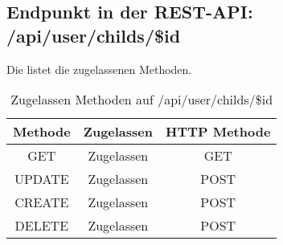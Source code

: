 \subsection{Endpunkt in der REST-API: /api/user/childs/\$id}
Die  listet die zugelassenen Methoden. 

\begin{table}[!htbp]
	\begin{tabular}{|c|c|c|}
		\hline
			\textbf{Methode} & \textbf{Zugelassen} & \textbf{HTTP Methode} \\ \hline
			GET & Zugelassen & GET \\ \hline
			UPDATE & Zugelassen & POST \\ \hline 
			CREATE & Zugelassen & POST \\ \hline 
			DELETE & Zugelassen & POST \\ \hline
	\end{tabular}

		\caption{Zugelassen Methoden auf /api/user/childs/\$id}
		\label{tab:end:rest:api:user:childs:id:meth}
\end{table}